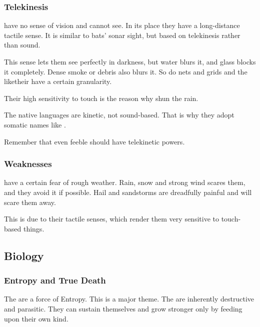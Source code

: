 \subsubsection{Telekinesis}
\Banes{} have no sense of vision and cannot see. 
In its place they have a long-distance tactile sense. 
It is similar to bats' sonar sight, but based on telekinesis rather than sound. 

This sense lets them see perfectly in darkness, but water blurs it, and glass blocks it completely. 
Dense smoke or debris also blurs it. 
So do nets and grids and the like\dash their  have a certain granularity. 

Their high sensitivity to touch is the reason why \banes{} shun the rain. 

The \banes{} native languages are kinetic, not sound-based. 
That is why they adopt somatic names like \quo{\Daggerrain}. 

Remember that even feeble \lesserbanes{} should have telekinetic powers. 





\subsubsection{Weaknesses}
\Banes{} have a certain fear of rough weather. 
Rain, snow and strong wind scares them, and they avoid it if possible. 
Hail and sandstorms are dreadfully painful and will scare them away. 

This is due to their tactile senses, which render them very sensitive to touch-based things. 









\subsection{Biology}





\subsubsection{Entropy and True Death}
The \banes{} are a force of Entropy. 
This is a major theme. 
The \banes{} are inherently destructive and parasitic. 
They can sustain themselves and grow stronger only by feeding upon their own kind. 

